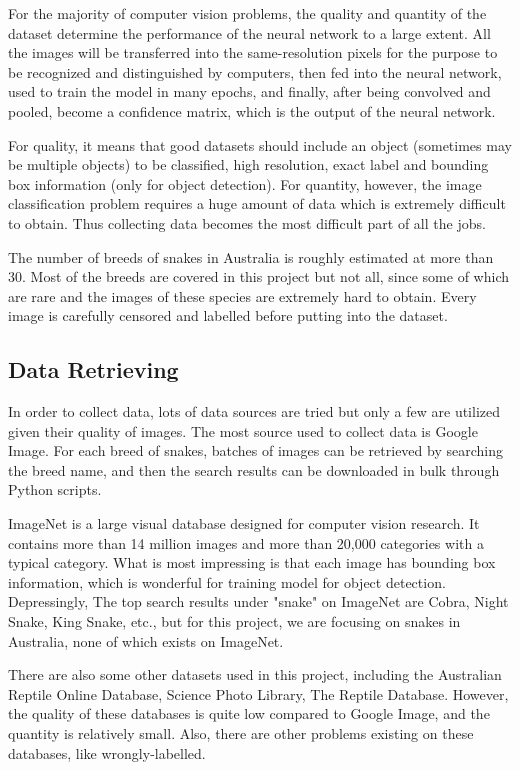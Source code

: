 \documentclass{article}
\begin{document}
For the majority of computer vision problems, the quality and quantity of the dataset determine the performance of the neural network to a large extent. All the images will be transferred into the same-resolution pixels for the purpose to be recognized and distinguished by computers, then fed into the neural network, used to train the model in many epochs, and finally, after being convolved and pooled, become a confidence matrix, which is the output of the neural network.

For quality, it means that good datasets should include an object (sometimes may be multiple objects) to be classified, high resolution, exact label and bounding box information (only for object detection). For quantity, however, the image classification problem requires a huge amount of data which is extremely difficult to obtain. Thus collecting data becomes the most difficult part of all the jobs.

The number of breeds of snakes in Australia is roughly estimated at more than 30. Most of the breeds are covered in this project but not all, since some of which are rare and the images of these species are extremely hard to obtain. Every image is carefully censored and labelled before putting into the dataset.

\subsection{Data Retrieving}
In order to collect data, lots of data sources are tried but only a few are utilized given their quality of images. The most source used to collect data is Google Image. For each breed of snakes, batches of images can be retrieved by searching the breed name, and then the search results can be downloaded in bulk through Python scripts.

ImageNet is a large visual database designed for computer vision research. It contains more than 14 million images and more than 20,000 categories with a typical category. What is most impressing is that each image has bounding box information, which is wonderful for training model for object detection. Depressingly, The top search results under "snake" on ImageNet are Cobra, Night Snake, King Snake, etc., but for this project, we are focusing on snakes in Australia, none of which exists on ImageNet.

There are also some other datasets used in this project, including the Australian Reptile Online Database, Science Photo Library, The Reptile Database. However, the quality of these databases is quite low compared to Google Image, and the quantity is relatively small. Also, there are other problems existing on these databases, like wrongly-labelled.
\end{document}
